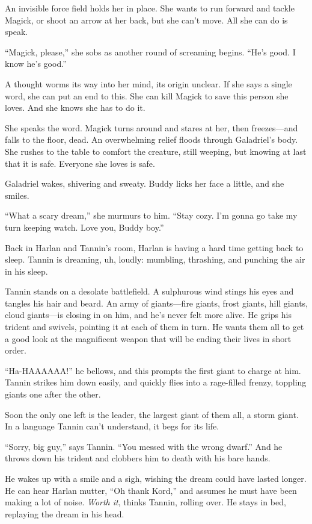 \documentclass[smalldemyvopaper,11pt,twoside,onecolumn,openright,extrafontsizes]{memoir}
\begin{document}
An invisible force field holds her in place. She wants to run forward
and tackle Magick, or shoot an arrow at her back, but she can't move.
All she can do is speak.

``Magick, please,'' she sobs as another round of screaming begins.
``He's good. I know he's good.''

A thought worms its way into her mind, its origin unclear. If she says a
single word, she can put an end to this. She can kill Magick to save
this person she loves. And she knows she has to do it.

She speaks the word. Magick turns around and stares at her, then
freezes---and falls to the floor, dead. An overwhelming relief floods
through Galadriel's body. She rushes to the table to comfort the
creature, still weeping, but knowing at last that it is safe. Everyone
she loves is safe.

Galadriel wakes, shivering and sweaty. Buddy licks her face a little,
and she smiles.

``What a scary dream,'' she murmurs to him. ``Stay cozy. I'm gonna go
take my turn keeping watch. Love you, Buddy boy.''

Back in Harlan and Tannin's room, Harlan is having a hard time getting
back to sleep. Tannin is dreaming, uh, loudly: mumbling, thrashing, and
punching the air in his sleep.

Tannin stands on a desolate battlefield. A sulphurous wind stings his
eyes and tangles his hair and beard. An army of giants---fire giants,
frost giants, hill giants, cloud giants---is closing in on him, and he's
never felt more alive. He grips his trident and swivels, pointing it at
each of them in turn. He wants them all to get a good look at the
magnificent weapon that will be ending their lives in short order.

``Ha-HAAAAAA!'' he bellows, and this prompts the first giant to charge
at him. Tannin strikes him down easily, and quickly flies into a
rage-filled frenzy, toppling giants one after the other.

Soon the only one left is the leader, the largest giant of them all, a
storm giant. In a language Tannin can't understand, it begs for its
life.

``Sorry, big guy,'' says Tannin. ``You messed with the wrong dwarf.''
And he throws down his trident and clobbers him to death with his bare
hands.

He wakes up with a smile and a sigh, wishing the dream could have lasted
longer. He can hear Harlan mutter, ``Oh thank Kord,'' and assumes he
must have been making a lot of noise. \emph{Worth it}, thinks Tannin,
rolling over. He stays in bed, replaying the dream in his head.
\end{document}
